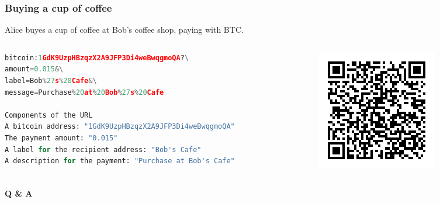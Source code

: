 \begin{frame}[fragile]
    \frametitle{Buying a cup of coffee}
    Alice buyes a cup of coffee at Bob's coffee shop, paying with BTC.
    \begin{columns}
        \begin{column}{0.6\textwidth}
            \begin{lstlisting}[language=Python]
bitcoin:1GdK9UzpHBzqzX2A9JFP3Di4weBwqgmoQA?\
amount=0.015&\
label=Bob%27s%20Cafe&\
message=Purchase%20at%20Bob%27s%20Cafe

Components of the URL
A bitcoin address: "1GdK9UzpHBzqzX2A9JFP3Di4weBwqgmoQA"
The payment amount: "0.015"
A label for the recipient address: "Bob's Cafe"
A description for the payment: "Purchase at Bob's Cafe"
            \end{lstlisting}
        \end{column}
        \begin{column}{0.3\textwidth}
            \includegraphics[scale=1]{./figures/mbc2_0202.png}
        \end{column}
    \end{columns}
\end{frame}

\begin{frame}
    \begin{center}
        \textbf{\alert{\huge{Q \& A}}}
    \end{center}
\end{frame}

